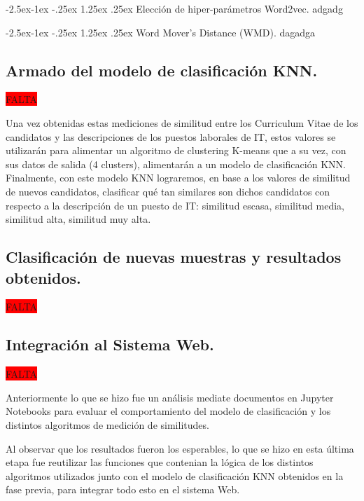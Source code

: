 \documentclass[12pt,a4paper]{article}
\makeatletter
\renewcommand\paragraph{\@startsection{paragraph}{4}{\z@}
            {-2.5ex\@plus -1ex \@minus -.25ex}
            {1.25ex \@plus .25ex}
            {\normalfont\normalsize\bfseries}}
\makeatother
\begin{document}
\begin{sloppypar}
\paragraph{Elección de hiper-parámetros Word2vec.}\label{hiper_par_word2vec}
adgadg
\cleardoublepage

\paragraph{Word Mover's Distance (WMD).}
dagadga
\cleardoublepage


\subsection{Armado del modelo de clasificación KNN.}\label{IMP_Modelo_clasificacion_KNN}
\colorbox{red}{FALTA}

Una vez obtenidas estas mediciones de similitud entre los Curriculum Vitae de los candidatos y las descripciones de los puestos laborales de IT, estos valores se utilizarán para alimentar un algoritmo de clustering K-means que a su vez, con sus datos de salida (4 clusters), alimentarán a un modelo de clasificación KNN. Finalmente, con este modelo KNN lograremos, en base a los valores de similitud de nuevos candidatos, clasificar qué tan similares son dichos candidatos con respecto a la descripción de un puesto de IT: similitud escasa, similitud media, similitud alta, similitud muy alta.

\cleardoublepage

\subsection{Clasificación de nuevas muestras y resultados obtenidos.}\label{5.4.Predicciondenuevasmuestrasyresultadosobtenidos}

\colorbox{red}{FALTA}

\cleardoublepage

\subsection{Integración al Sistema Web.}\label{5.5.IntegracionalSistemaWeb}
\colorbox{red}{FALTA}

Anteriormente lo que se hizo fue un análisis mediate documentos en Jupyter Notebooks para evaluar el comportamiento del modelo de clasificación y los distintos algoritmos de medición de similitudes. 

Al observar que los resultados fueron los esperables, lo que se hizo en esta última etapa fue reutilizar las funciones que contenian la lógica de los distintos algoritmos utilizados junto con el modelo de clasificación KNN obtenidos en la fase previa, para integrar todo esto en el sistema Web. 


\end{sloppypar}
\end{document}
